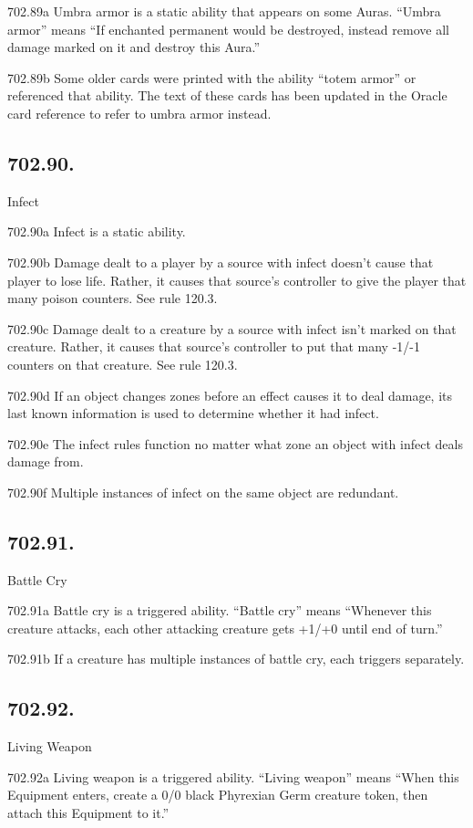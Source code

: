 702.89a Umbra armor is a static ability that appears on some Auras. “Umbra armor” means “If enchanted permanent would be destroyed, instead remove all damage marked on it and destroy this Aura.”

702.89b Some older cards were printed with the ability “totem armor” or referenced that ability. The text of these cards has been updated in the Oracle card reference to refer to umbra armor instead.

\subsection*{702.90.}
Infect

702.90a Infect is a static ability.

702.90b Damage dealt to a player by a source with infect doesn’t cause that player to lose life. Rather, it causes that source’s controller to give the player that many poison counters. See rule 120.3.

702.90c Damage dealt to a creature by a source with infect isn’t marked on that creature. Rather, it causes that source’s controller to put that many -1/-1 counters on that creature. See rule 120.3.

702.90d If an object changes zones before an effect causes it to deal damage, its last known information is used to determine whether it had infect.

702.90e The infect rules function no matter what zone an object with infect deals damage from.

702.90f Multiple instances of infect on the same object are redundant.

\subsection*{702.91.}
Battle Cry

702.91a Battle cry is a triggered ability. “Battle cry” means “Whenever this creature attacks, each other attacking creature gets +1/+0 until end of turn.”

702.91b If a creature has multiple instances of battle cry, each triggers separately.

\subsection*{702.92.}
Living Weapon

702.92a Living weapon is a triggered ability. “Living weapon” means “When this Equipment enters, create a 0/0 black Phyrexian Germ creature token, then attach this Equipment to it.”


